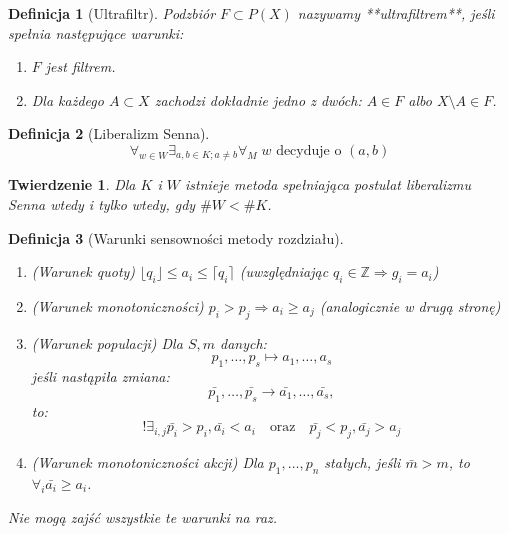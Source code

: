 \documentclass[12pt,a4paper]{article}
\theoremstyle{break}
\newtheorem{definition}{Definicja}[section]
\newtheorem{theorem}{Twierdzenie}[section]
\begin{document}
	\begin{definition}[Ultrafiltr]
		Podzbiór $F \subset P(X)$ nazywamy **ultrafiltrem**, jeśli spełnia następujące warunki:
		\begin{enumerate}[1)]
			\item $F$ jest filtrem.
			\item Dla każdego $A \subset X$ zachodzi dokładnie jedno z dwóch: $A \in F$ albo $X \setminus A \in F$.
		\end{enumerate}
	\end{definition}

	\begin{definition}[Liberalizm Senna]
		\[
		\forall_{w \in W} \exists_{a, b \in K; a \neq b} \forall_M \; w \text{ decyduje o } (a, b)
		\]
	\end{definition}

	\begin{theorem}
		Dla $K$ i $W$ istnieje metoda spełniająca postulat liberalizmu Senna \textit{wtedy i tylko wtedy}, gdy $\# W < \# K$.
	\end{theorem}

	\begin{definition}[Warunki sensowności metody rozdziału]
		\begin{enumerate}[1.]
			\item (Warunek quoty) $\lfloor q_i \rfloor \leq a_i \leq \lceil q_i \rceil$ (uwzględniając $q_i \in \mathbb{Z} \Rightarrow g_i = a_i$)
			\item (Warunek monotoniczności) $p_i > p_j \Rightarrow a_i \geq a_j$ (analogicznie w drugą stronę)
			\item (Warunek populacji) Dla $S, m$ danych:
			\[
			p_1, \dots, p_s \longmapsto a_1, \dots, a_s
			\]
			jeśli nastąpiła zmiana:
			\[
			\bar{p_1}, \dots, \bar{p_s} \longrightarrow \bar{a_1}, \dots, \bar{a_s},
			\]
			to:
			\[
			!\exists_{i,j} \bar{p_i}>p_i, \bar{a_i}<a_i \quad \text{oraz} \quad \bar{p_j}<p_j, \bar{a_j}>a_j
			\]
			\item (Warunek monotoniczności akcji) Dla $p_1,\dots,p_n$ stałych, jeśli $\bar{m}>m$, to $\forall_i \bar{a_i} \geq a_i$.
		\end{enumerate}
		Nie mogą zajść wszystkie te warunki na raz.
	\end{definition}
\end{document}
